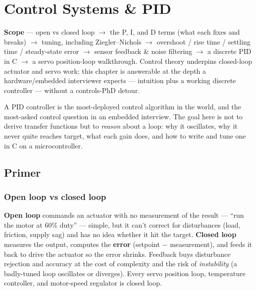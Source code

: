 
\chapter{Control Systems \& PID}
\label{ch:control-pid}

\begin{partnote}
\textbf{Scope} --- open vs closed loop $\rightarrow$ the P, I, and D terms
(what each fixes and breaks) $\rightarrow$ tuning, including Ziegler--Nichols
$\rightarrow$ overshoot / rise time / settling time / steady-state error
$\rightarrow$ sensor feedback \& noise filtering $\rightarrow$ a discrete PID in
C $\rightarrow$ a servo position-loop walkthrough. Control theory underpins
closed-loop actuator and servo work; this chapter is answerable at the depth a
hardware/embedded interviewer expects --- intuition plus a working discrete
controller --- without a controls-PhD detour.
\end{partnote}

A PID controller is the most-deployed control algorithm in the world, and the
most-asked control question in an embedded interview. The goal here is not to
derive transfer functions but to \emph{reason} about a loop: why it oscillates,
why it never quite reaches target, what each gain does, and how to write and
tune one in C on a microcontroller.

\section{Primer}

\subsection{Open loop vs closed loop}

\textbf{Open loop} commands an actuator with no measurement of the result ---
``run the motor at 60\% duty'' --- simple, but it can't correct for disturbances
(load, friction, supply sag) and has no idea whether it hit the target.
\textbf{Closed loop} measures the output, computes the \textbf{error}
(setpoint $-$ measurement), and feeds it back to drive the actuator so the error
shrinks. Feedback buys disturbance rejection and accuracy at the cost of
complexity and the risk of \emph{instability} (a badly-tuned loop oscillates or
diverges). Every servo position loop, temperature controller, and motor-speed
regulator is closed loop.

